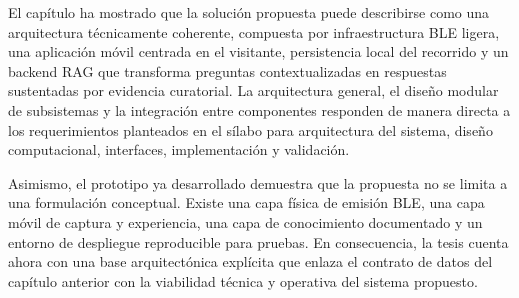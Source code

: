 El capítulo ha mostrado que la solución propuesta puede describirse como una arquitectura técnicamente coherente, compuesta por infraestructura BLE ligera, una aplicación móvil centrada en el visitante, persistencia local del recorrido y un backend RAG que transforma preguntas contextualizadas en respuestas sustentadas por evidencia curatorial. La arquitectura general, el diseño modular de subsistemas y la integración entre componentes responden de manera directa a los requerimientos planteados en el sílabo para arquitectura del sistema, diseño computacional, interfaces, implementación y validación.

Asimismo, el prototipo ya desarrollado demuestra que la propuesta no se limita a una formulación conceptual. Existe una capa física de emisión BLE, una capa móvil de captura y experiencia, una capa de conocimiento documentado y un entorno de despliegue reproducible para pruebas. En consecuencia, la tesis cuenta ahora con una base arquitectónica explícita que enlaza el contrato de datos del capítulo anterior con la viabilidad técnica y operativa del sistema propuesto.
